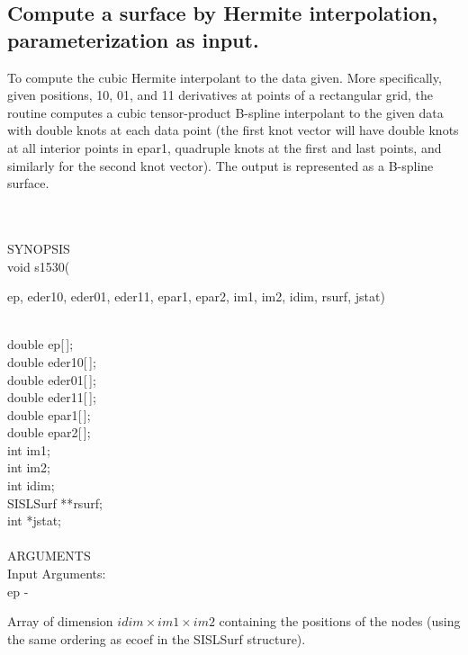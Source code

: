 \subsection{Compute a surface by Hermite interpolation, parameter\-ization as input.}
\begin{minipg1}
  To compute the cubic Hermite interpolant to the data given.
  More specifically, given positions, 10, 01, and 11
  derivatives at points of a rectangular grid, the routine
  computes a cubic tensor-product B-spline interpolant to
  the given data with double knots at each data point (the first
  knot vector will have double knots at all interior points
  in epar1, quadruple knots at the first and last points,
  and similarly for the second knot vector).
  The output is represented as a B-spline surface.
\end{minipg1} \\ \\
SYNOPSIS\\
        \>void s1530(\begin{minipg3}
          {\fov ep}, {\fov eder10}, {\fov eder01}, {\fov eder11}, {\fov epar1}, {\fov epar2},
          {\fov im1}, {\fov im2}, {\fov idim}, {\fov rsurf}, {\fov jstat})
        \end{minipg3}\\[0.3ex]
        \>\>    double \> {\fov ep}[\,];\\
        \>\>    double \> {\fov eder10}[\,];\\
        \>\>    double \> {\fov eder01}[\,];\\
        \>\>    double \> {\fov eder11}[\,];\\
        \>\>    double \> {\fov epar1}[\,];\\
        \>\>    double \> {\fov epar2}[\,];\\
        \>\>    int    \> {\fov im1};\\
        \>\>    int    \> {\fov im2};\\
        \>\>    int    \> {\fov idim};\\
        \>\>    SISLSurf \> **{\fov rsurf};\\
        \>\>    int    \> *{\fov jstat};\\
\\
ARGUMENTS\\
        \>Input Arguments:\\
        \>\>    {\fov ep} \> - \>
        \begin{minipg2}
          Array of dimension $idim\times im1\times im2$ containing
          the positions of the nodes (using the same ordering
          as {\fov ecoef} in the SISLSurf structure).
        \end{minipg2}\\[0.8ex]
